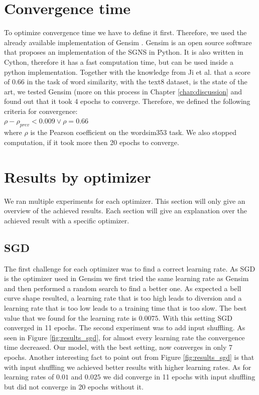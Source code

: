\section{Convergence time}
To optimize convergence time we have to define it first. Therefore, we used the already available implementation of Gensim \cite{gensim}. Gensim is an open source software that proposes an implementation of the SGNS in Python. It is also written in Cython, therefore it has a fast computation time, but can be used inside a python implementation. Together with the knowledge from Ji et al.\cite{intel} that a score of $0.66$ in the task of word similarity, with the text8 dataset, is the state of the art, we tested Gensim (more on this process in Chapter \ref{chap:discussion} and found out that it took 4 epochs to converge. Therefore, we defined the following criteria for convergence: \\
$\rho - \rho_{prev} < 0.009 \vee \rho = 0.66$ \\
where $\rho$ is the Pearson coefficient on the wordsim353 task.
We also stopped computation, if it took more then 20 epochs to converge.

\section{Results by optimizer}
We ran multiple experiments for each optimizer. This section will only give an overview of the achieved results. Each section will give an explanation over the achieved result with a specific optimizer.

\subsection{SGD}
The first challenge for each optimizer was to find a correct learning rate. As SGD is the optimizer used in Gensim \cite{gensim} we first tried the same learning rate as Gensim \cite{gensim} and then performed a random search to find a better one. As expected a bell curve shape resulted, a learning rate that is too high leads to diversion and a learning rate that is too low leads to a training time that is too slow. The best value that we found for the learning rate is $0.0075$. With this setting SGD converged in 11 epochs. The second experiment was to add input shuffling.
As seen in Figure \ref{fig:results_sgd}, for almost every learning rate the convergence time decreased. Our model, with the best setting, now converges in only 7 epochs. Another interesting fact to point out from Figure \ref{fig:results_sgd} is that with input shuffling we achieved better results with higher learning rates. As for learning rates of $0.01$ and $0.025$ we did converge in 11 epochs with input shuffling but did not converge in 20 epochs without it.

